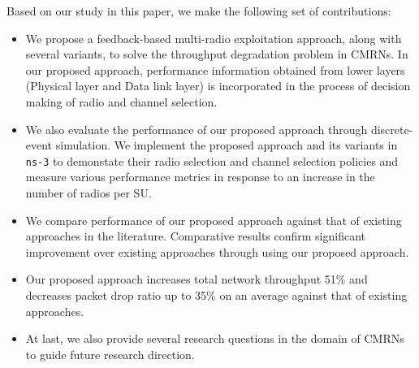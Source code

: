 

Based on our study in this paper, we make the following set of contributions:

\begin{itemize}
\item We propose a feedback-based multi-radio exploitation approach, along with several variants, to solve the throughput degradation problem in CMRNs. In our proposed approach, performance information obtained from lower layers (Physical layer and Data link layer) is incorporated in the process of decision making of radio and channel selection.
\item We also evaluate the performance of our proposed approach through discrete-event simulation. We implement the proposed approach and its variants in \texttt{ns-3} to demonstate their radio selection and channel selection policies and measure various performance metrics in response to an increase in the number of radios per SU.
\item We compare performance of our proposed approach against that of existing approaches in the literature. Comparative results confirm significant improvement over existing approaches through using our proposed approach.
\item Our proposed approach increases total network throughput 51\% and decreases packet drop ratio up to 35\% on an average against that of existing approaches.
\item At last, we also provide several research questions in the domain of CMRNs to guide future research direction.
\end{itemize}
\endinput
